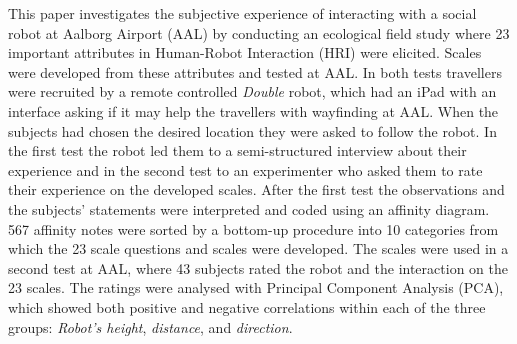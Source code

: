\label{Abstract}
This paper investigates the subjective experience of interacting with a social robot at Aalborg Airport (AAL) by conducting an ecological field study where 23 important attributes in Human-Robot Interaction (HRI) were elicited. Scales were developed from these attributes and tested at AAL. In both tests travellers were recruited by a remote controlled \textit{Double} robot, which had an iPad with an interface asking if it may help the travellers with wayfinding at AAL. When the subjects had chosen the desired location they were asked to follow the robot. In the first test the robot led them to a semi-structured interview about their experience and in the second test to an experimenter who asked them to rate their experience on the developed scales. After the first test the observations and the subjects' statements were interpreted and coded using an affinity diagram. 567 affinity notes were sorted by a bottom-up procedure into 10 categories from which the 23 scale questions and scales were developed. The scales were used in a second test at AAL, where 43 subjects rated the robot and the interaction on the 23 scales. The ratings were analysed with Principal Component Analysis (PCA), which showed both positive and negative correlations within each of the three groups: \textit{Robot's height}, \textit{distance}, and \textit{direction}. 


%
%



